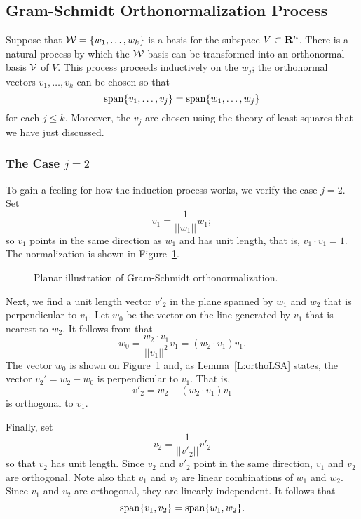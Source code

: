 \subsection*{Gram-Schmidt Orthonormalization Process}

Suppose that ${\cal W} = \{w_1,\ldots,w_k\}$ is a basis for the subspace
$V\subset\mbox{$\bf{R}$}^n$.  There is a natural process by which the ${\cal W}$ basis
can be transformed into an
orthonormal basis
${\cal V}$ of $V$.  This
process proceeds inductively on the $w_j$; the orthonormal vectors
$v_1,\ldots,v_k$ can be chosen so that
\[
{\rm span}\{v_1,\ldots,v_j\} = {\rm span}\{w_1,\ldots,w_j\}
\]
for each $j\leq k$.  Moreover, the $v_j$ are chosen using the theory of
least squares that we have just discussed.

\subsubsection*{The Case $j=2$}

To gain a feeling for how the induction process works, we verify the case
$j=2$.  Set
\begin{equation}  \label{E:ortho1}
v_1 = \frac{1}{||w_1||}w_1;
\end{equation}
so $v_1$ points in the same direction as $w_1$ and has unit length, that is,
$v_1\cdot v_1=1$.  The normalization is shown in Figure~\ref{F:gram}.

\begin{figure}[htb]
        \centerline{%
        }
        \caption{Planar illustration of Gram-Schmidt orthonormalization.}
        \label{F:gram}
\end{figure}

Next, we find a unit length vector $v'_2$ in the plane spanned by $w_1$ and
$w_2$ that is perpendicular
to $v_1$. Let $w_0$ be the vector on the line
generated by $v_1$ that is nearest to $w_2$.  It follows from
 that
\[
w_0 = \frac{w_2\cdot v_1}{||v_1||^2}v_1 = (w_2\cdot v_1) v_1.
\]
The vector $w_0$ is shown on Figure~\ref{F:gram} and, as
Lemma~\ref{L:orthoLSA} states, the vector $v_2'=w_2-w_0$ is perpendicular to
$v_1$. That is,
\begin{equation}  \label{E:ortho2}
v'_2 = w_2 - (w_2\cdot v_1) v_1
\end{equation}
is orthogonal to $v_1$.

Finally, set
\begin{equation}  \label{E:ortho3}
v_2 = \frac{1}{||v'_2||}v'_2
\end{equation}
so that $v_2$ has unit length.  Since $v_2$ and $v'_2$ point in the
same direction, $v_1$ and $v_2$ are orthogonal.  Note also that $v_1$ and
$v_2$ are linear combinations of $w_1$ and $w_2$.  Since $v_1$ and $v_2$ are
orthogonal, they are linearly independent.  It follows that
\[
{\rm span}\{v_1,v_2\} = {\rm span}\{w_1,w_2\}.
\]

